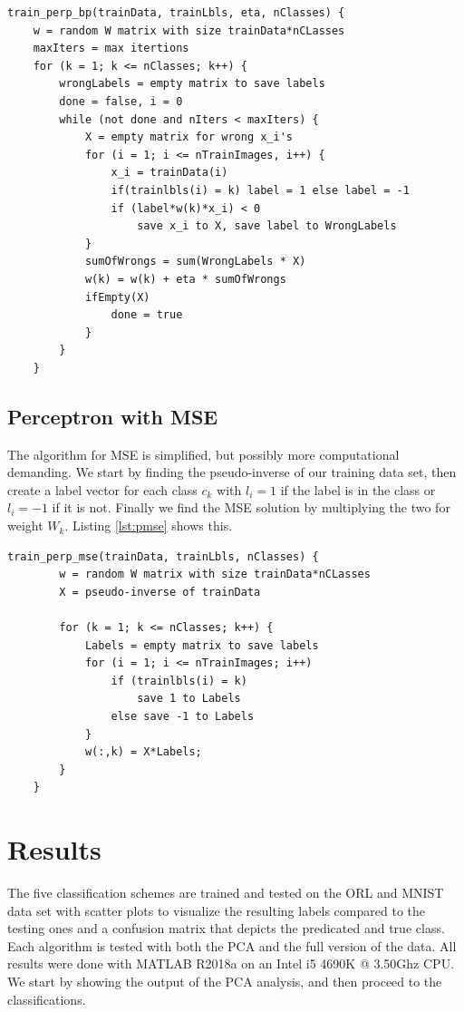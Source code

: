 \documentclass[journal]{IEEEtran}
\begin{document}
\begin{minipage}[H]{0.95\linewidth}
	\begin{lstlisting}[caption=Implementation of NSC., label={lst:pbp}]
	train_perp_bp(trainData, trainLbls, eta, nClasses) {
	w = random W matrix with size trainData*nCLasses
	maxIters = max itertions
	for (k = 1; k <= nClasses; k++) {
		wrongLabels = empty matrix to save labels
		done = false, i = 0
		while (not done and nIters < maxIters) {
			X = empty matrix for wrong x_i's
			for (i = 1; i <= nTrainImages, i++) {
				x_i = trainData(i)
				if(trainlbls(i) = k) label = 1 else label = -1
				if (label*w(k)*x_i) < 0
					save x_i to X, save label to WrongLabels
			}
			sumOfWrongs = sum(WrongLabels * X)
			w(k) = w(k) + eta * sumOfWrongs
			ifEmpty(X)
				done = true
			}
		}
	}
	\end{lstlisting}
\end{minipage}

\subsection{Perceptron with MSE} 

The algorithm for MSE is simplified, but possibly more computational demanding. We start by finding the pseudo-inverse of our training data set, then create a label vector for each class $c_{k}$ with $l_{i} = 1$ if the label is in the class or $l_{i} = -1$ if it is not. Finally we find the MSE solution by multiplying the two for weight $W_{k}$. Listing \ref{lst:pmse} shows this.

\begin{minipage}[H]{0.95\linewidth}
	\begin{lstlisting}[caption=Implementation of NSC., label={lst:pmse}]
	train_perp_mse(trainData, trainLbls, nClasses) {
		w = random W matrix with size trainData*nCLasses
		X = pseudo-inverse of trainData
		
		for (k = 1; k <= nClasses; k++) {
			Labels = empty matrix to save labels
			for (i = 1; i <= nTrainImages; i++)
				if (trainlbls(i) = k)
					save 1 to Labels
				else save -1 to Labels
			}
			w(:,k) = X*Labels;
		}
	}
	\end{lstlisting}
\end{minipage}

\section{Results}

The five classification schemes are trained and tested on the ORL and MNIST data set with scatter plots to visualize the resulting labels compared to the testing ones and a confusion matrix that depicts the predicated and true class. Each algorithm is tested with both the PCA and the full version of the data. All results were done with MATLAB R2018a on an Intel i5 4690K @ 3.50Ghz CPU. We start by showing the output of the PCA analysis, and then proceed to the classifications.
\end{document}
